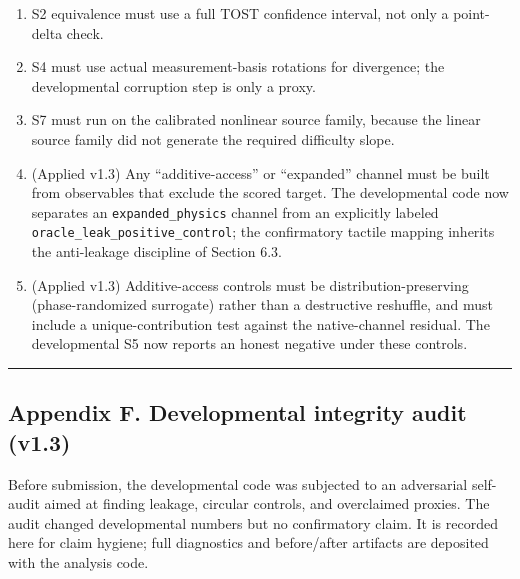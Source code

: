 \documentclass[
  11pt,
]{article}
\providecommand{\tightlist}{%
  \setlength{\itemsep}{0pt}\setlength{\parskip}{0pt}}
\begin{document}
\begin{enumerate}
\def\labelenumi{\arabic{enumi}.}
\tightlist
\item
  S2 equivalence must use a full TOST confidence
  interval, not only a point-delta check.
\item
  S4 must use actual measurement-basis rotations for
  divergence; the developmental corruption step is only
  a proxy.
\item
  S7 must run on the calibrated nonlinear source
  family, because the linear source family did not
  generate the required difficulty slope.
\item
  (Applied v1.3) Any ``additive-access'' or
  ``expanded'' channel must be built from observables
  that exclude the scored target. The developmental
  code now separates an \texttt{expanded\_physics}
  channel from an explicitly labeled
  \texttt{oracle\_leak\_positive\_control}; the
  confirmatory tactile mapping inherits the
  anti-leakage discipline of Section 6.3.
\item
  (Applied v1.3) Additive-access controls must be
  distribution-preserving (phase-randomized surrogate)
  rather than a destructive reshuffle, and must include
  a unique-contribution test against the native-channel
  residual. The developmental S5 now reports an honest
  negative under these controls.
\end{enumerate}

\begin{center}\rule{0.5\linewidth}{0.5pt}\end{center}

\subsection{Appendix F. Developmental integrity audit
(v1.3)}\label{appendix-f.-developmental-integrity-audit-v1.3}

Before submission, the developmental code was subjected
to an adversarial self-audit aimed at finding leakage,
circular controls, and overclaimed proxies. The audit
changed developmental numbers but no confirmatory
claim. It is recorded here for claim hygiene; full
diagnostics and before/after artifacts are deposited
with the analysis code.
\end{document}
